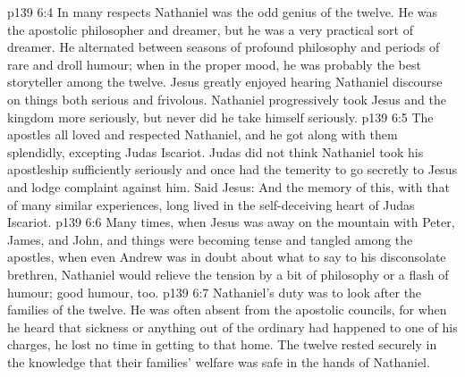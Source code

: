 \vs p139 6:4 In many respects Nathaniel was the odd genius of the twelve. He was the apostolic philosopher and dreamer, but he was a very practical sort of dreamer. He alternated between seasons of profound philosophy and periods of rare and droll humour; when in the proper mood, he was probably the best storyteller among the twelve. Jesus greatly enjoyed hearing Nathaniel discourse on things both serious and frivolous. Nathaniel progressively took Jesus and the kingdom more seriously, but never did he take himself seriously.
\vs p139 6:5 The apostles all loved and respected Nathaniel, and he got along with them splendidly, excepting Judas Iscariot. Judas did not think Nathaniel took his apostleship sufficiently seriously and once had the temerity to go secretly to Jesus and lodge complaint against him. Said Jesus:  And the memory of this, with that of many similar experiences, long lived in the self\hyp{}deceiving heart of Judas Iscariot.
\vs p139 6:6 Many times, when Jesus was away on the mountain with Peter, James, and John, and things were becoming tense and tangled among the apostles, when even Andrew was in doubt about what to say to his disconsolate brethren, Nathaniel would relieve the tension by a bit of philosophy or a flash of humour; good humour, too.
\vs p139 6:7 Nathaniel’s duty was to look after the families of the twelve. He was often absent from the apostolic councils, for when he heard that sickness or anything out of the ordinary had happened to one of his charges, he lost no time in getting to that home. The twelve rested securely in the knowledge that their families’ welfare was safe in the hands of Nathaniel.
